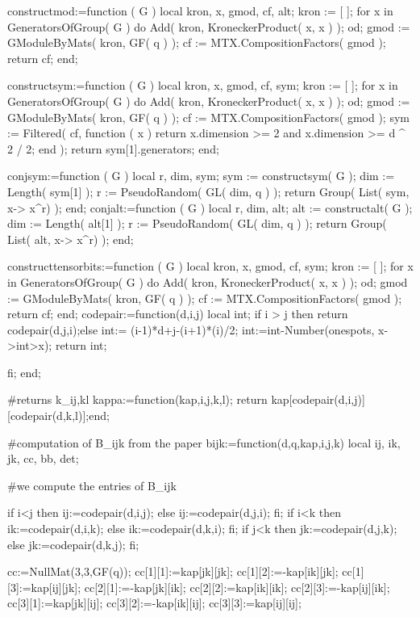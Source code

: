 constructmod:=function ( G )
    local  kron, x, gmod, cf, alt;
    kron := [  ];
    for x  in GeneratorsOfGroup( G )  do
        Add( kron, KroneckerProduct( x, x ) );
    od;
    gmod := GModuleByMats( kron, GF( q ) );
    cf := MTX.CompositionFactors( gmod );
return cf;
end;

constructsym:=function ( G )
    local  kron, x, gmod, cf, sym;
    kron := [  ];
    for x  in GeneratorsOfGroup( G )  do
        Add( kron, KroneckerProduct( x, x ) );
    od;
    gmod := GModuleByMats( kron, GF( q ) );
    cf := MTX.CompositionFactors( gmod );
    sym := Filtered( cf, function ( x )
            return x.dimension >= 2 and x.dimension >= d ^ 2 / 2;
        end );
    return sym[1].generators;
end;

conjsym:=function ( G )
    local  r, dim, sym;
    sym := constructsym( G );
    dim := Length( sym[1] );
    r := PseudoRandom( GL( dim, q ) );
    return Group( List( sym, x-> x^r) );
end;
conjalt:=function ( G )
    local  r, dim, alt;
    alt := constructalt( G );
    dim := Length( alt[1] );
    r := PseudoRandom( GL( dim, q ) );
    return Group( List( alt, x-> x^r) );
end;

constructtensorbits:=function ( G )
    local  kron, x, gmod, cf, sym;
    kron := [  ];
    for x  in GeneratorsOfGroup( G )  do
        Add( kron, KroneckerProduct( x, x ) );
    od;
    gmod := GModuleByMats( kron, GF( q ) );
    cf := MTX.CompositionFactors( gmod );
    return cf;
end;
codepair:=function(d,i,j) local int;
if i > j then return codepair(d,j,i);else
int:= (i-1)*d+j-(i+1)*(i)/2;
int:=int-Number(onespots, x->int>x);
return int;

fi;
end;

#returns k_{ij,kl}
kappa:=function(kap,i,j,k,l);
return kap[codepair(d,i,j)][codepair(d,k,l)];end;

#computation of B_{ijk} from the paper
bijk:=function(d,q,kap,i,j,k)
local ij, ik, jk, cc, bb, det;

#we compute the entries of B_{ijk} 

if i<j then 
   ij:=codepair(d,i,j);
else 
   ij:=codepair(d,j,i);
fi;
if i<k then 
   ik:=codepair(d,i,k);
else 
   ik:=codepair(d,k,i);
fi;
if j<k then 
   jk:=codepair(d,j,k);
else 
   jk:=codepair(d,k,j);
fi;

cc:=NullMat(3,3,GF(q));
cc[1][1]:=kap[jk][jk];
cc[1][2]:=-kap[ik][jk];
cc[1][3]:=kap[ij][jk];
cc[2][1]:=-kap[jk][ik];
cc[2][2]:=kap[ik][ik];
cc[2][3]:=-kap[ij][ik];
cc[3][1]:=kap[jk][ij];
cc[3][2]:=-kap[ik][ij];
cc[3][3]:=kap[ij][ij];

